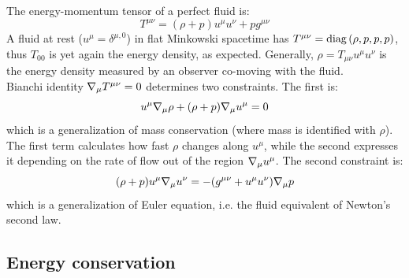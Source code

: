 The energy-momentum tensor of a perfect fluid is:
\begin{equation}
  T^{\mu \nu} = (\rho + p) u^\mu u^\nu + p g^{\mu \nu}
  \label{eq:em-tens-fluid}
\end{equation}
A fluid at rest ($ u^\mu = \delta^{\mu,0} $) in flat Minkowski spacetime has $ T^{\mu \nu} = \operatorname{diag} \left( \rho, p, p, p \right) $, thus $ T_{00} $ is yet again the energy density, as expected. Generally, $ \rho = T_{\mu \nu} u^\mu u^\nu $ is the energy density measured by an observer co-moving with the fluid.\\
Bianchi identity $ \nabla_\mu T^{\mu \nu} = 0 $ determines two constraints. The first is:
\begin{equation}
  u^\mu \nabla_\mu \rho + (\rho + p) \nabla_\mu u^\mu = 0
\end{equation}
which is a generalization of mass conservation (where mass is identified with $ \rho $). The first term calculates how fast $ \rho $ changes along $ u^\mu $, while the second expresses it depending on the rate of flow out of the region $ \nabla_\mu u^\mu $. The second constraint is:
\begin{equation}
  (\rho + p) u^\mu \nabla_\mu u^\nu = - (g^{\mu \nu} + u^\mu u^\nu) \nabla_\mu p
  \label{eq:euler-eq}
\end{equation}
which is a generalization of Euler equation, i.e. the fluid equivalent of Newton's second law.

\subsection{Energy conservation}
\label{ssec:energy-conservation}

